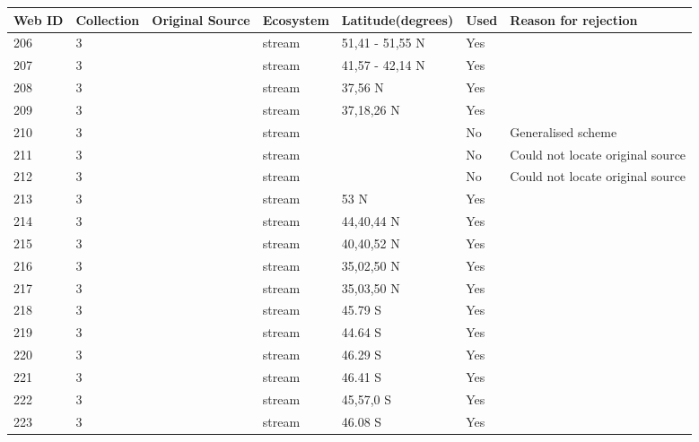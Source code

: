 \documentclass[12pt]{article}
\begin{document}
\begin{landscape}
    \begin{table}[h!]
    \centering
    {\footnotesize
      \begin{tabular}{p{2.8cm}p{1.3cm}p{5.5cm}p{2.2cm}p{2.5cm}lp{3.5cm}}
        \hline
        Web ID & Collection & Original Source & Ecosystem & Latitude(degrees) & Used  & Reason for rejection  \\
        \hline
        206   & 3 & \cite{Jones1949}     & stream & 51,41 - 51,55 N & Yes   &       \\
        207   & 3 & \cite{Koslucher1973}    & stream & 41,57 - 42,14 N & Yes   &       \\
        208   & 3 & \cite{Minckley1963}    & stream & 37,56 N & Yes   &       \\
        209   & 3 & \cite{Minshall1967}    & stream & 37,18,26 N & Yes   &       \\
        210   & 3 & \cite{Percival1929}     & stream &       & No    & Generalised scheme \\
        211   & 3 & \cite{Ricker1935}  & stream &       & No    & Could not locate original source \\
        212   & 3 & \cite{Ricker1935}  & stream &       & No    & Could not locate original source \\
        213   & 3 & \cite{Badcock1949}     & stream & 53 N  & Yes   &       \\
        214   & 3 & \cite{Thompson2003}    & stream & 44,40,44 N & Yes   &       \\
        215   & 3 & \cite{Thompson2003}    & stream & 40,40,52 N & Yes   &       \\
        216   & 3 & \cite{Thompson2003}    & stream & 35,02,50 N & Yes   &       \\
        217   & 3 & \cite{Thompson2003}    & stream & 35,03,50 N & Yes   &       \\
        218   & 3 & \cite{Thompson2004c}  & stream & 45.79 S & Yes   &       \\
        219   & 3 & \cite{Thompson2004c}  & stream & 44.64 S & Yes   &       \\
        220   & 3 & \cite{Thompson2004c}  & stream & 46.29 S & Yes   &       \\
        221   & 3 & \cite{Thompson2004c}  & stream & 46.41 S & Yes   &       \\
        222   & 3 & \cite{Thompson2004c}  & stream & 45,57,0 S & Yes   &       \\
        223   & 3 & \cite{Thompson2004c}  & stream & 46.08 S & Yes   &       \\

\end{tabular}}
\end{table}
\end{landscape}
\end{document}
